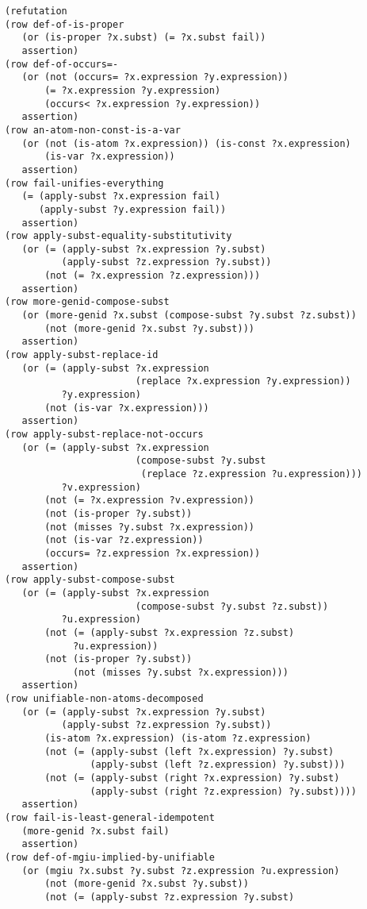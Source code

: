 \documentclass[runningheads]{llncs}
\begin{document}
\begin{verbatim}
(refutation
(row def-of-is-proper
   (or (is-proper ?x.subst) (= ?x.subst fail))
   assertion)
(row def-of-occurs=-
   (or (not (occurs= ?x.expression ?y.expression))
       (= ?x.expression ?y.expression)
       (occurs< ?x.expression ?y.expression))
   assertion)
(row an-atom-non-const-is-a-var
   (or (not (is-atom ?x.expression)) (is-const ?x.expression)
       (is-var ?x.expression))
   assertion)
(row fail-unifies-everything
   (= (apply-subst ?x.expression fail) 
      (apply-subst ?y.expression fail))
   assertion)
(row apply-subst-equality-substitutivity
   (or (= (apply-subst ?x.expression ?y.subst)
          (apply-subst ?z.expression ?y.subst))
       (not (= ?x.expression ?z.expression)))
   assertion)
(row more-genid-compose-subst
   (or (more-genid ?x.subst (compose-subst ?y.subst ?z.subst))
       (not (more-genid ?x.subst ?y.subst)))
   assertion)
(row apply-subst-replace-id
   (or (= (apply-subst ?x.expression
                       (replace ?x.expression ?y.expression))
          ?y.expression)
       (not (is-var ?x.expression)))
   assertion)
(row apply-subst-replace-not-occurs
   (or (= (apply-subst ?x.expression
                       (compose-subst ?y.subst
                        (replace ?z.expression ?u.expression)))
          ?v.expression)
       (not (= ?x.expression ?v.expression)) 
       (not (is-proper ?y.subst))
       (not (misses ?y.subst ?x.expression))
       (not (is-var ?z.expression))
       (occurs= ?z.expression ?x.expression))
   assertion)
(row apply-subst-compose-subst
   (or (= (apply-subst ?x.expression 
                       (compose-subst ?y.subst ?z.subst))
          ?u.expression)
       (not (= (apply-subst ?x.expression ?z.subst) 
            ?u.expression))
       (not (is-proper ?y.subst)) 
            (not (misses ?y.subst ?x.expression)))
   assertion)
(row unifiable-non-atoms-decomposed
   (or (= (apply-subst ?x.expression ?y.subst)
          (apply-subst ?z.expression ?y.subst))
       (is-atom ?x.expression) (is-atom ?z.expression)
       (not (= (apply-subst (left ?x.expression) ?y.subst)
               (apply-subst (left ?z.expression) ?y.subst)))
       (not (= (apply-subst (right ?x.expression) ?y.subst)
               (apply-subst (right ?z.expression) ?y.subst))))
   assertion)
(row fail-is-least-general-idempotent
   (more-genid ?x.subst fail)
   assertion)
(row def-of-mgiu-implied-by-unifiable
   (or (mgiu ?x.subst ?y.subst ?z.expression ?u.expression)
       (not (more-genid ?x.subst ?y.subst))
       (not (= (apply-subst ?z.expression ?y.subst)

\end{verbatim}
\end{document}
